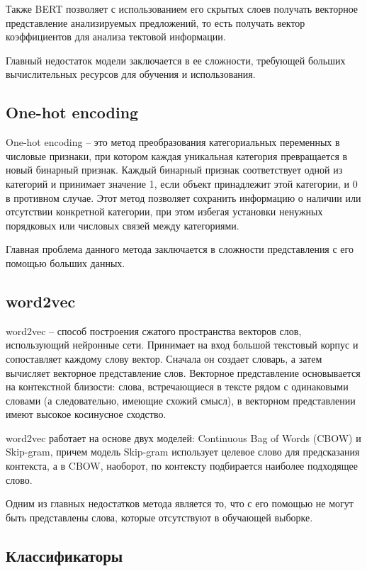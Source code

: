 Также BERT позволяет с использованием его скрытых слоев получать векторное представление анализируемых предложений, то есть получать вектор коэффициентов для анализа тектовой информации.

Главный недостаток модели заключается в ее сложности, требующей больших вычислительных ресурсов для обучения и использования.

\subsection{One-hot encoding}
One-hot encoding -- это метод преобразования категориальных переменных в числовые признаки, при котором каждая уникальная категория превращается в новый бинарный признак. Каждый бинарный признак соответствует одной из категорий и принимает значение 1, если объект принадлежит этой категории, и 0 в противном случае. Этот метод позволяет сохранить информацию о наличии или отсутствии конкретной категории, при этом избегая установки ненужных порядковых или числовых связей между категориями.

Главная проблема данного метода заключается в сложности представления с его помощью больших данных.

\subsection{word2vec}
word2vec -- способ построения сжатого пространства векторов слов, использующий нейронные сети. Принимает на вход большой текстовый корпус и сопоставляет каждому слову вектор. Сначала он создает словарь, а затем вычисляет векторное представление слов. Векторное представление основывается на контекстной близости: слова, встречающиеся в тексте рядом с одинаковыми словами (а следовательно, имеющие схожий смысл), в векторном представлении имеют высокое косинусное сходство. \cite{word2vec}

word2vec работает на основе двух моделей: Continuous Bag of Words (CBOW) и Skip-gram, причем модель Skip-gram использует целевое слово для предсказания контекста, а в CBOW, наоборот, по контексту подбирается наиболее подходящее слово.

Одним из главных недостатков метода является то, что с его помощью не могут быть представлены слова, которые отсутствуют в обучающей выборке.

\subsection{Классификаторы}

